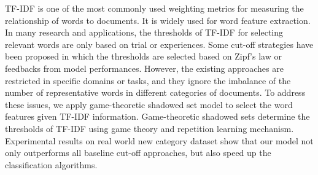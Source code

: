 

TF-IDF is one of the most commonly used weighting metrics for measuring the relationship of words to documents. It is widely used for word feature extraction. In many research and applications, the thresholds of TF-IDF for selecting relevant words are only based on trial or experiences. Some cut-off strategies have been proposed in which the thresholds are selected based on Zipf's law or feedbacks from model performances.
However, the existing approaches are restricted in specific domains or tasks, and they ignore the imbalance of the number of representative words in different categories of documents. To address these issues, we apply game-theoretic shadowed set model to select the word features given TF-IDF information.
Game-theoretic shadowed sets determine the thresholds of TF-IDF using game theory and repetition learning mechanism.
Experimental results on real world new category dataset show that our model not only outperforms all baseline cut-off approaches, but also speed up the classification algorithms.



